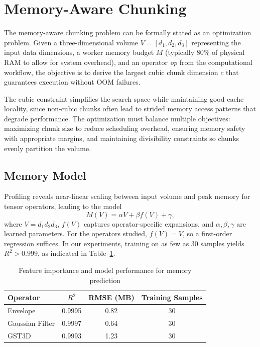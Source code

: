 \section{Memory-Aware Chunking}
\label{sec:methodology}

The memory-aware chunking problem can be formally stated as an optimization problem.
Given a three-dimensional volume $V=[d_1,d_2,d_3]$ representing the input data dimensions, a worker memory budget $M$ (typically 80\% of physical \ac{RAM} to allow for system overhead), and an operator \textit{op} from the computational workflow, the objective is to derive the largest cubic chunk dimension $c$ that guarantees execution without \ac{OOM} failures.

The cubic constraint simplifies the search space while maintaining good cache locality, since non-cubic chunks often lead to strided memory access patterns that degrade performance.
The optimization must balance multiple objectives: maximizing chunk size to reduce scheduling overhead, ensuring memory safety with appropriate margins, and maintaining divisibility constraints so chunks evenly partition the volume.

\subsection{Memory Model}

Profiling reveals near-linear scaling between input volume and peak memory for tensor operators, leading to the model
\begin{equation}
M(V)=\alpha V+\beta f(V)+\gamma,\label{eq:model}
\end{equation}
where $V=d_1d_2d_3$, $f(V)$ captures operator-specific expansions, and $\alpha,\beta,\gamma$ are learned parameters.
For the operators studied, $f(V)=V$, so a first-order regression suffices.
In our experiments, training on as few as 30 samples yields $R^2>0.999$, as indicated in Table~\ref{tab:feature-importance}.

\begin{table}[htb]
    \centering
    \caption{Feature importance and model performance for memory prediction}
    \label{tab:feature-importance}
    \begin{tabular}{lccc}
        \toprule
        \textbf{Operator} & \textbf{$R^2$} & \textbf{RMSE (MB)} & \textbf{Training Samples} \\
        \midrule
        Envelope & 0.9995 & 0.82 & 30 \\
        Gaussian Filter & 0.9997 & 0.64 & 30 \\
        \ac{GST3D} & 0.9993 & 1.23 & 30 \\
        \bottomrule
    \end{tabular}
\end{table}

